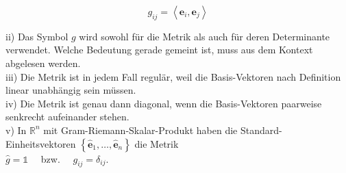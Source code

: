 \documentclass[10pt]{article}
\begin{document}
\begin{equation*}
g_{i j}=\left\langle\mathbf{e}_{i}, \mathbf{e}_{j}\right\rangle \tag{7.94}
\end{equation*}


ii) Das Symbol $g$ wird sowohl für die Metrik als auch für deren Determinante verwendet. Welche Bedeutung gerade gemeint ist, muss aus dem Kontext abgelesen werden.\\
iii) Die Metrik ist in jedem Fall regulär, weil die Basis-Vektoren nach Definition linear unabhängig sein müssen.\\
iv) Die Metrik ist genau dann diagonal, wenn die Basis-Vektoren paarweise senkrecht aufeinander stehen.\\
v) In $\mathbb{R}^{n}$ mit Gram-Riemann-Skalar-Produkt haben die Standard-Einheitsvektoren $\left\{\hat{\mathbf{e}}_{1}, \ldots, \hat{\mathbf{e}}_{n}\right\}$ die Metrik\\
$\hat{g}=\mathbb{1} \quad$ bzw. $\quad g_{i j}=\delta_{i j}$.
\end{document}
